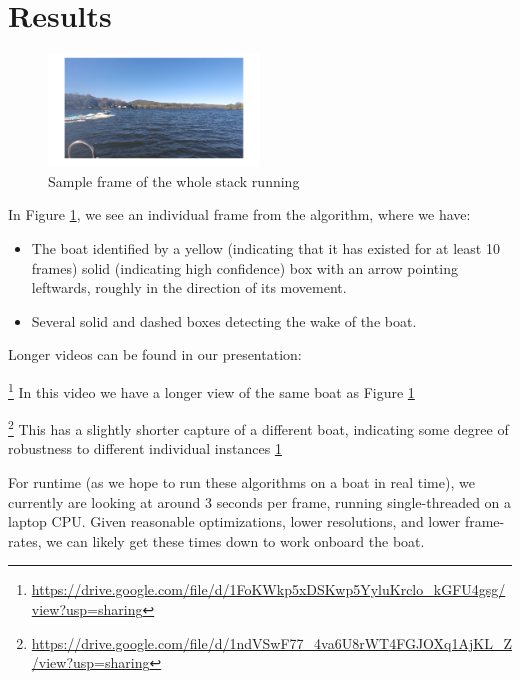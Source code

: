 \documentclass[conference]{IEEEtran}
\begin{document}
\section{Results}

\begin{figure}
\centering
\includegraphics[width=0.5\textwidth]{example_detection}
\caption{Sample frame of the whole stack running}
\label{fig:example_detection}
\end{figure}

In Figure \ref{fig:example_detection}, we see an individual frame from the
algorithm, where we have:
\begin{itemize}
\item The boat identified by a yellow (indicating that it has existed for at
      least 10 frames) solid (indicating high confidence) box with an arrow
      pointing leftwards, roughly in the direction of its movement.
\item Several solid and dashed boxes detecting the wake of the boat.
\end{itemize}

Longer videos can be found in our presentation:

\begin{description}
\sloppy
\item  \footnote{\url{https://drive.google.com/file/d/1FoKWkp5xDSKwp5YyluKrclo_kGFU4gsg/view?usp=sharing}}
  In this video we have a longer view of the same boat as Figure
  \ref{fig:example_detection}
\item \footnote{\url{https://drive.google.com/file/d/1ndVSwF77_4va6U8rWT4FGJOXq1AjKL_Z/view?usp=sharing}}
  This has a slightly shorter capture of a different boat, indicating some
  degree of robustness to different individual instances
  \ref{fig:example_detection}
\end{description}

For runtime (as we hope to run these algorithms on a boat in real time),
we currently are looking at around 3 seconds per frame, running single-threaded
on a laptop CPU. Given reasonable optimizations, lower resolutions, and lower
frame-rates, we can likely get these times down to work onboard the boat.
\end{document}
